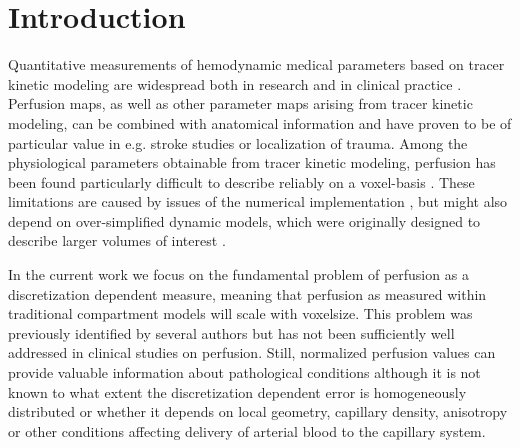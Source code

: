 \documentclass[final,5p,times,twocolumn]{elsarticle}
\begin{document}
\section{Introduction}
	Quantitative measurements of hemodynamic medical parameters based on tracer kinetic modeling are widespread both in research and in clinical practice \cite{sourbron13,Feng2013,Chen2011}. 
	Perfusion maps, as well as other parameter maps arising from tracer kinetic modeling, can be combined with anatomical information and have proven to be of particular value in e.g. stroke studies or localization of trauma.
	Among the physiological parameters obtainable from tracer kinetic modeling, perfusion has been found particularly difficult to describe reliably on a voxel-basis \cite{kudo10}.
	These limitations are caused by issues of the numerical implementation \cite{kudo10}, but might also depend on over-simplified dynamic models, which were originally designed to describe larger volumes of interest \cite{zierler00}.	
	
In the current work we focus on the fundamental problem of perfusion as a discretization dependent measure, meaning that perfusion as measured within traditional compartment models will scale with voxelsize. This problem was previously identified by several authors \cite{Henkelman1990,Guibert2013,sourbron14} but has not been sufficiently well addressed in clinical studies on perfusion. Still, normalized perfusion values can provide valuable information about pathological conditions although it is not known to what extent the discretization dependent error is homogeneously distributed or whether it depends on local geometry, capillary density, anisotropy or other conditions affecting delivery of arterial blood to the capillary system. %
\end{document}
